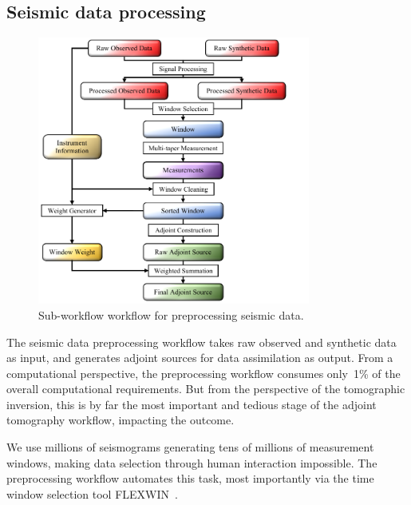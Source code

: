 \documentclass[extra,mreferee]{gji}
\begin{document}
\subsection{Seismic data processing}

\begin{figure}
  \centering
  \includegraphics[width=0.8\textwidth]{figures/Preprocess_workflow.pdf}
  \caption{\small{Sub-workflow workflow for preprocessing seismic data.}}
  \label{fig:preprocess_workflow}
\end{figure}

The seismic data preprocessing workflow takes raw observed and synthetic data as input,
and generates adjoint sources for data assimilation as output.
From a computational perspective, the preprocessing workflow consumes only~1\%
of the overall computational requirements.
But from the perspective of the tomographic inversion, this is by far the most
important and tedious stage of the adjoint tomography workflow,
impacting the outcome.

We use millions of seismograms generating tens of millions of measurement windows,
making data selection through human interaction impossible.
The preprocessing workflow automates this task,
most importantly via the time window selection tool FLEXWIN~\citep{maggi2009automated}.
\end{document}
